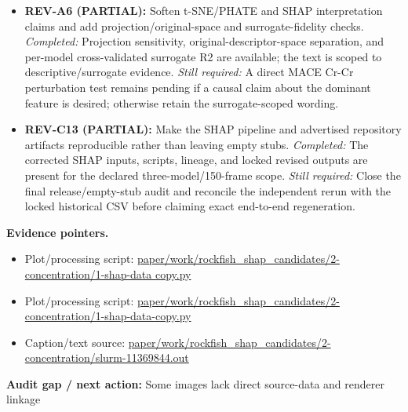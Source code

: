 \documentclass[10pt]{article}
\newcommand{\statusline}[1]{\colorbox{gray!12}{\parbox{0.96\linewidth}{#1}}}
\begin{document}
\begin{itemize}[leftmargin=1.4em,noitemsep]
\item \textbf{REV-A6 (PARTIAL):} Soften t-SNE/PHATE and SHAP interpretation claims and add projection/original-space and surrogate-fidelity checks. \emph{Completed:} Projection sensitivity, original-descriptor-space separation, and per-model cross-validated surrogate R2 are available; the text is scoped to descriptive/surrogate evidence. \emph{Still required:} A direct MACE Cr-Cr perturbation test remains pending if a causal claim about the dominant feature is desired; otherwise retain the surrogate-scoped wording.
\item \textbf{REV-C13 (PARTIAL):} Make the SHAP pipeline and advertised repository artifacts reproducible rather than leaving empty stubs. \emph{Completed:} The corrected SHAP inputs, scripts, lineage, and locked revised outputs are present for the declared three-model/150-frame scope. \emph{Still required:} Close the final release/empty-stub audit and reconcile the independent rerun with the locked historical CSV before claiming exact end-to-end regeneration.
\end{itemize}
\textbf{Evidence pointers.}
\begin{itemize}[leftmargin=1.4em,noitemsep]
\item Plot/processing script: \begingroup\scriptsize\url{paper/work/rockfish_shap_candidates/2-concentration/1-shap-data copy.py}\endgroup
\item Plot/processing script: \begingroup\scriptsize\url{paper/work/rockfish_shap_candidates/2-concentration/1-shap-data-copy.py}\endgroup
\item Caption/text source: \begingroup\scriptsize\url{paper/work/rockfish_shap_candidates/2-concentration/slurm-11369844.out}\endgroup
\end{itemize}
\statusline{\textbf{Audit gap / next action:} Some images lack direct source-data and renderer linkage}
\vfill
\clearpage
\end{document}
